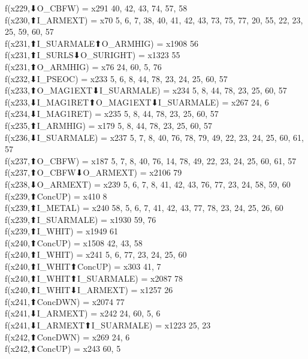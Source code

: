 f(x229,⬇O_CBFW) = x291 {40, 42, 43, 74, 57, 58} \\
f(x230,⬆I_ARMEXT) = x70 {5, 6, 7, 38, 40, 41, 42, 43, 73, 75, 77, 20, 55, 22, 23, 25, 59, 60, 57} \\
f(x231,⬆I_SUARMALE⬆O_ARMHIG) = x1908 {56} \\
f(x231,⬆I_SURLS⬇O_SURIGHT) = x1323 {55} \\
f(x231,⬆O_ARMHIG) = x76 {24, 60, 5, 76} \\
f(x232,⬇I_PSEOC) = x233 {5, 6, 8, 44, 78, 23, 24, 25, 60, 57} \\
f(x233,⬆O_MAG1EXT⬇I_SUARMALE) = x234 {5, 8, 44, 78, 23, 25, 60, 57} \\
f(x233,⬇I_MAG1RET⬆O_MAG1EXT⬇I_SUARMALE) = x267 {24, 6} \\
f(x234,⬇I_MAG1RET) = x235 {5, 8, 44, 78, 23, 25, 60, 57} \\
f(x235,⬆I_ARMHIG) = x179 {5, 8, 44, 78, 23, 25, 60, 57} \\
f(x236,⬇I_SUARMALE) = x237 {5, 7, 8, 40, 76, 78, 79, 49, 22, 23, 24, 25, 60, 61, 57} \\
f(x237,⬆O_CBFW) = x187 {5, 7, 8, 40, 76, 14, 78, 49, 22, 23, 24, 25, 60, 61, 57} \\
f(x237,⬆O_CBFW⬇O_ARMEXT) = x2106 {79} \\
f(x238,⬇O_ARMEXT) = x239 {5, 6, 7, 8, 41, 42, 43, 76, 77, 23, 24, 58, 59, 60} \\
f(x239,⬆ConcUP) = x410 {8} \\
f(x239,⬆I_METAL) = x240 {58, 5, 6, 7, 41, 42, 43, 77, 78, 23, 24, 25, 26, 60} \\
f(x239,⬆I_SUARMALE) = x1930 {59, 76} \\
f(x239,⬆I_WHIT) = x1949 {61} \\
f(x240,⬆ConcUP) = x1508 {42, 43, 58} \\
f(x240,⬆I_WHIT) = x241 {5, 6, 77, 23, 24, 25, 60} \\
f(x240,⬆I_WHIT⬆ConcUP) = x303 {41, 7} \\
f(x240,⬆I_WHIT⬆I_SUARMALE) = x2087 {78} \\
f(x240,⬆I_WHIT⬇I_ARMEXT) = x1257 {26} \\
f(x241,⬆ConcDWN) = x2074 {77} \\
f(x241,⬇I_ARMEXT) = x242 {24, 60, 5, 6} \\
f(x241,⬇I_ARMEXT⬆I_SUARMALE) = x1223 {25, 23} \\
f(x242,⬆ConcDWN) = x269 {24, 6} \\
f(x242,⬆ConcUP) = x243 {60, 5} \\
